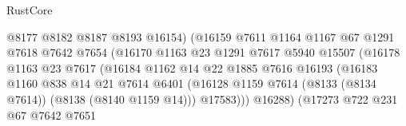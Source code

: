 \begin{lexlean}{RustCore}
\begin{coremodule}
                                        @8177
                                        @8182
                                        @8187
                                        @8193
                                        @16154)
                                      (@16159
                                        @7611
                                        @1164
                                        @1167
                                        @67
                                        @1291
                                        @7618
                                        @7642
                                        @7654
                                        (@16170
                                          @1163
                                          @23
                                          @1291
                                          @7617
                                          @5940
                                          @15507
                                          (@16178
                                            @1163
                                            @23
                                            @7617
                                            (@16184
                                              @1162
                                              @14
                                              @22
                                              @1885
                                              @7616
                                              @16193
                                              (@16183
                                                @1160
                                                @838
                                                @14
                                                @21
                                                @7614
                                                @6401
                                                (@16128
                                                  @1159
                                                  @7614
                                                  (@8133 (@8134 @7614))
                                                  (@8138 (@8140 @1159 @14)))
                                                @17583)))
                                          @16288)
                                        (@17273
                                          @722
                                          @231
                                          @67
                                          @7642
                                          @7651

\end{coremodule}
\end{lexlean}
